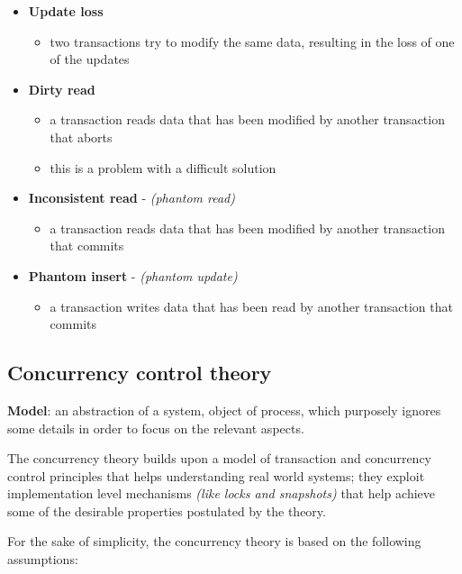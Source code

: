 \documentclass[english]{article}
\begin{document}
\begin{itemize}
  \item \textbf{Update loss}
        \begin{itemize}
          \item two transactions try to modify the same data, resulting in the loss of one of the updates
        \end{itemize}
  \item \textbf{Dirty read}
        \begin{itemize}
          \item a transaction reads data that has been modified by another transaction that aborts
          \item this is a problem with a difficult solution
        \end{itemize}
  \item \textbf{Inconsistent read} - \textit{(phantom read)}
        \begin{itemize}
          \item a transaction reads data that has been modified by another transaction that commits
        \end{itemize}
  \item \textbf{Phantom insert} - \textit{(phantom update)}
        \begin{itemize}
          \item a transaction writes data that has been read by another transaction that commits
        \end{itemize}
\end{itemize}

\subsection{Concurrency control theory}

\textbf{Model}: an abstraction of a system, object of process, which purposely ignores some details in order to focus on the relevant aspects.

The concurrency theory builds upon a model of transaction and concurrency control principles that helps understanding real world systems;
they exploit implementation level mechanisms \textit{(like locks and snapshots)} that help achieve some of the desirable properties postulated by the theory.

For the sake of simplicity, the concurrency theory is based on the following assumptions:
\end{document}
